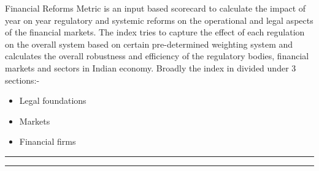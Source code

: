 \documentclass[a4paper,12pt,leqno]{article}
\makeatletter
\renewenvironment{titlepage}
{%
  \cleardoublepage
  \if@twocolumn
  \@restonecoltrue\onecolumn
  \else
  \@restonecolfalse\newpage
  \fi
  \thispagestyle{empty}%
}%
{\if@restonecol\twocolumn \else \newpage \fi
}
\renewenvironment{titlepage}
{%
  \cleardoublepage
  \if@twocolumn
  \@restonecoltrue\onecolumn
  \else
  \@restonecolfalse\newpage
  \fi
  \thispagestyle{empty}%
}%
{\if@restonecol\twocolumn \else \newpage \fi
  \if@twoside\else
  \fi
}
\newlength{\textwidthorig}
\makeatother
\begin{document}

\newpage
Financial Reforms Metric is an input based scorecard to calculate the
impact of year on year regulatory and systemic reforms on the
operational and legal aspects of the financial markets. The index
tries to capture the effect of each regulation on the overall system
based on certain pre-determined weighting system and calculates the
overall robustness and efficiency of the regulatory bodies, financial markets and   
sectors in Indian economy. Broadly the index in divided under 3
sections:-
\begin{itemize}
\item Legal foundations
\item Markets
\item Financial firms
\end{itemize}

\begin{titlepage}

  \parbox{\textwidthorig}{
  \hrule
  \vspace{\baselineskip} 
  \vspace{\baselineskip}
  \hrule
  }

  \parbox{\textwidthorig}{
}

\end{titlepage}

\end{document}

